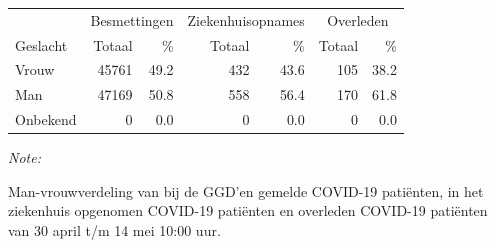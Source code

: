 \documentclass[
  english,
  man,floatsintext]{apa6}
\begin{document}
\begin{table}
\centering\begingroup\fontsize{11}{13}\selectfont

\begin{threeparttable}
\begin{tabular}{lrrrrrr}
\toprule
\multicolumn{1}{c}{ } & \multicolumn{2}{c}{Besmettingen} & \multicolumn{2}{c}{Ziekenhuisopnames} & \multicolumn{2}{c}{Overleden} \\
\cmidrule(l{3pt}r{3pt}){2-3} \cmidrule(l{3pt}r{3pt}){4-5} \cmidrule(l{3pt}r{3pt}){6-7}
Geslacht & Totaal & \% & Totaal & \% & Totaal & \%\\
\midrule
Vrouw & 45761 & 49.2 & 432 & 43.6 & 105 & 38.2\\
Man & 47169 & 50.8 & 558 & 56.4 & 170 & 61.8\\
Onbekend & 0 & 0.0 & 0 & 0.0 & 0 & 0.0\\
\bottomrule
\end{tabular}
\begin{tablenotes}
\item \textit{Note: } 
\item Man-vrouwverdeling van bij de GGD’en gemelde COVID-19 patiënten, in het ziekenhuis opgenomen COVID-19 patiënten en overleden COVID-19 patiënten van 30 april t/m 14 mei 10:00 uur.
\end{tablenotes}
\end{threeparttable}
\endgroup{}
\end{table}
\newpage
\end{document}
